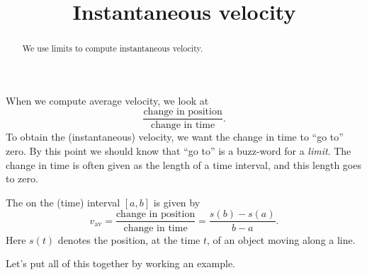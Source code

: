 \documentclass{ximera}
\title[Dig-In:]{Instantaneous velocity}
\begin{document}
\begin{abstract}
We use limits to compute instantaneous velocity.
\end{abstract}
\maketitle

When we compute average velocity, we look at 
\[
\frac{\text{change in position}}{\text{change in time}}.
\]
To obtain the (instantaneous) velocity, we want the change in time to
``go to'' zero. By this point we should know that ``go to'' is a
buzz-word for a \emph{limit}. The change in time is often given as
the length of a time interval, and this length goes to zero.

\begin{definition}
	The  on the (time) interval $[a,b]$ is given by
	\[ v_{\text{av}} = \frac{\text{change in position}}{\text{change in time}} =
		\frac{s(b)-s(a)}{b-a}.\]
	Here $s(t)$ denotes the position, at the time $t$, of an object moving along a line.
\end{definition}

Let's put all of this together by working an example.
\end{document}
